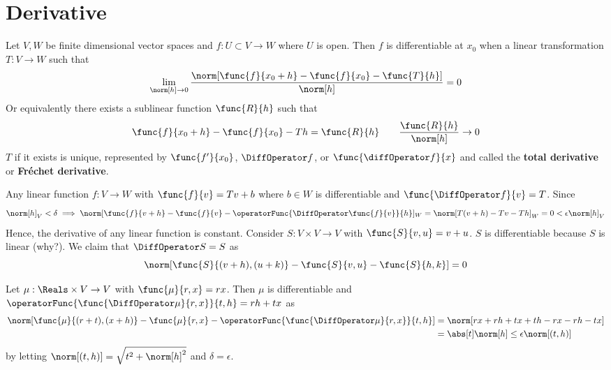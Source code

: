 \section{Derivative}
Let \(V,W\) be finite dimensional vector spaces and \(f: U \subset V \to W\) where \(U\) is open. Then \(f\) is differentiable at \(x_0\) when a linear transformation \(T : V \to W\) such that
\begin{equation*}
    \lim_{\norm[h] \to 0} \dfrac{\norm[\func{f}{x_0 + h} - \func{f}{x_0} - \func{T}{h}]}{\norm[h]}= 0
\end{equation*}
Or equivalently there exists a sublinear function \(\func{R}{h}\) such that
\begin{equation*}
    \func{f}{x_0 + h} - \func{f}{x_0} - Th = \func{R}{h} \qquad \frac{\func{R}{h}}{\norm[h]} \to 0
\end{equation*}
\(T\) if it exists is unique, represented by \(\func{f'}{x_0}\), \(\DiffOperator f\), or \(\func{\diffOperator f}{x}\) and called the \textbf{total derivative} or \textbf{Fr\'{e}chet derivative}.

\begin{example}
    Any linear function \(f : V \to W\) with \(\func{f}{v} = Tv + b\) where \(b \in W\) is differentiable and \(\func{\DiffOperator f}{v} = T\). Since
    \begin{equation*}
        \norm[h]_V < \delta \implies \norm[\func{f}{v + h} - \func{f}{v} - \operatorFunc{\DiffOperator \func{f}{v}}{h}]_W = \norm[T(v+h) - Tv - Th]_W = 0 < \epsilon \norm[h]_V
    \end{equation*}
    Hence, the derivative of any linear function is constant.
    Consider \(S : V \times V \to V\) with \(\func{S}{v,u} = v + u\). \(S\) is differentiable because \(S\) is linear (why?). We claim that \(\DiffOperator S = S\) as
    \begin{equation*}
        \norm[\func{S}{(v + h),(u + k)} - \func{S}{v,u} - \func{S}{h,k}] = 0
    \end{equation*}
\end{example}

\begin{example}
    Let \(\mu : \Reals \times V \to V\) with \(\func{\mu}{r,x} = rx\). Then \(\mu\) is differentiable and \(\operatorFunc{\func{\DiffOperator \mu}{r,x}}{t,h} = rh + tx\) as
    \begin{align*}
        \norm[\func{\mu}{(r + t),(x + h)} - \func{\mu}{r,x} - \operatorFunc{\func{\DiffOperator \mu}{r,x}}{t,h}] & = \norm[rx + rh + tx + th - rx - rh - tx]     \\
                                                                                                                 & = \abs[t] \norm[h] \leq \epsilon \norm[(t,h)]
    \end{align*}
    by letting \(\norm[(t,h)] = \sqrt{t^2 + \norm[h]^2}\) and \(\delta = \epsilon\).
\end{example}

